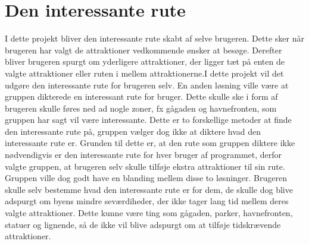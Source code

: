 \section{Den interessante rute}
I dette projekt bliver den interessante rute skabt af selve brugeren. Dette sker når brugeren har valgt de attraktioner vedkommende ønsker at besøge. Derefter bliver brugeren spurgt om yderligere attraktioner, der ligger tæt på enten de valgte attraktioner eller ruten i mellem attraktionerne.I dette projekt vil det udgøre den interessante rute for brugeren selv.\newline
En anden løsning ville være at gruppen dikterede en interessant rute for bruger. Dette skulle ske i form af brugeren skulle føres ned ad nogle zoner, fx gågaden og havnefronten, som gruppen har sagt vil være interessante. \newline
Dette er to forskellige metoder at finde den interessante rute på, gruppen vælger dog ikke at diktere hvad den interessante rute er. Grunden til dette er, at den rute som gruppen diktere ikke nødvendigvis er den interessante rute for hver bruger af programmet, derfor valgte gruppen, at brugeren selv skulle tilføje ekstra attraktioner til sin rute. Gruppen ville dog godt have en blanding mellem disse to løsninger. Brugeren skulle selv bestemme hvad den interessante rute er for dem, de skulle dog blive adspurgt om byens mindre seværdiheder, der ikke tager lang tid mellem deres valgte attraktioner. Dette kunne være ting som gågaden, parker, havnefronten, statuer og lignende, så de ikke vil blive adspurgt om at tilføje tidskrævende attraktioner. \newline



